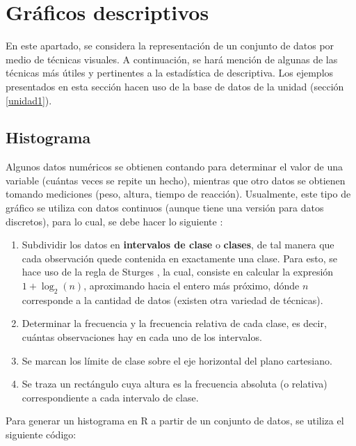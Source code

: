 \documentclass[
]{book}
\providecommand{\tightlist}{%
  \setlength{\itemsep}{0pt}\setlength{\parskip}{0pt}}
\begin{document}
\hypertarget{gruxe1ficos-descriptivos}{%
\section{Gráficos descriptivos}\label{gruxe1ficos-descriptivos}}

En este apartado, se considera la representación de un conjunto de datos por medio de técnicas visuales. A continuación, se hará mención de algunas de las técnicas más útiles y pertinentes a la estadística de descriptiva. Los ejemplos presentados en esta sección hacen uso de la base de datos de la unidad (sección \ref{unidad1}).

\hypertarget{histograma}{%
\subsection{Histograma}\label{histograma}}

Algunos datos numéricos se obtienen contando para determinar el valor de una variable (cuántas veces se repite un hecho), mientras que otro datos se obtienen tomando mediciones (peso, altura, tiempo de reacción). Usualmente, este tipo de gráfico se utiliza con datos continuos (aunque tiene una versión para datos discretos), para lo cual, se debe hacer lo siguiente \citep[página 12]{Devore}:

\begin{enumerate}
\def\labelenumi{\arabic{enumi}.}
\tightlist
\item
  Subdividir los datos en \textbf{intervalos de clase} o \textbf{clases}, de tal manera que cada observación quede contenida en exactamente una clase. Para esto, se hace uso de la regla de Sturges \citeyearpar{sturges1926choice}, la cual, consiste en calcular la expresión \(1+\log_2(n)\), aproximando hacia el entero más próximo, dónde \(n\) corresponde a la cantidad de datos (existen otra variedad de técnicas).
\item
  Determinar la frecuencia y la frecuencia relativa de cada clase, es decir, cuántas observaciones hay en cada uno de los intervalos.
\item
  Se marcan los límite de clase sobre el eje horizontal del plano cartesiano.
\item
  Se traza un rectángulo cuya altura es la frecuencia absoluta (o relativa) correspondiente a cada intervalo de clase.
\end{enumerate}

Para generar un histograma en R a partir de un conjunto de datos, se utiliza el siguiente código:
\end{document}

